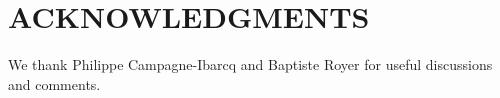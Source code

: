 \documentclass[a4paper, 11pt]{article}
\begin{document}
\section*{ACKNOWLEDGMENTS}
 We thank Philippe Campagne-Ibarcq and Baptiste Royer
 for useful discussions and comments.













\end{document}
